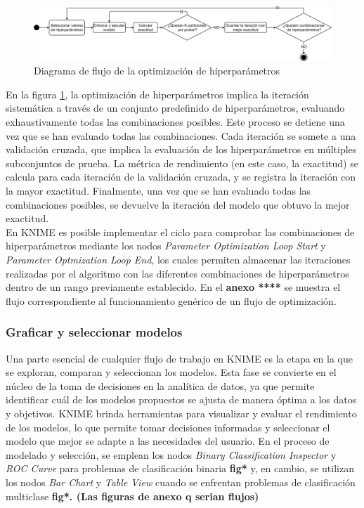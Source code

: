 \begin{figure}[H]
	\centering
	\includegraphics[width=1\linewidth]{"figuras/capi 2/hpo/Optimizacion a resumen 2.14"}
	\caption{Diagrama de flujo de la optimización de hiperparámetros}
	\label{fig:optimizacion-a-resumen-2}
\end{figure}

En la figura \ref{fig:optimizacion-a-resumen-2}, la optimización de hiperparámetros implica la iteración sistemática a través de un conjunto predefinido de hiperparámetros, evaluando exhaustivamente todas las combinaciones posibles. Este proceso se detiene una vez que se han evaluado todas las combinaciones. Cada iteración se somete a una validación cruzada, que implica la evaluación de los hiperparámetros en múltiples subconjuntos de prueba. La métrica de rendimiento (en este caso, la exactitud) se calcula para cada iteración de la validación cruzada, y se registra la iteración con la mayor exactitud. Finalmente, una vez que se han evaluado todas las combinaciones posibles, se devuelve la iteración del modelo que obtuvo la mejor exactitud. \\
En KNIME es posible implementar el ciclo para comprobar las combinaciones de hiperparámetros mediante los nodos \textit{Parameter Optimization Loop Start} y \textit{Parameter Optmization Loop End}, los cuales permiten almacenar las iteraciones realizadas por el algoritmo con las diferentes combinaciones de hiperparámetros dentro de un rango previamente establecido. En el \textbf{anexo ****} se muestra el flujo correspondiente al funcionamiento genérico de un flujo de optimización.

\subsubsection*{Graficar y seleccionar modelos}
Una parte esencial de cualquier flujo de trabajo en KNIME es la etapa en la que se exploran, comparan y seleccionan los modelos. Esta fase se convierte en el núcleo de la toma de decisiones en la analítica de datos, ya que permite identificar cuál de los modelos propuestos se ajusta de manera óptima a los datos y objetivos.
KNIME brinda herramientas para visualizar y evaluar el rendimiento de los modelos, lo que permite tomar decisiones informadas y seleccionar el modelo que mejor se adapte a las necesidades del usuario. En el proceso de modelado y selección, se emplean los nodos \textit{Binary Classification Inspector} y \textit{ROC Curve} para problemas de clasificación binaria \textbf{fig*} y, en cambio, se utilizan los nodos \textit{Bar Chart} y \textit{Table View} cuando se enfrentan problemas de clasificación multiclase \textbf{fig*. (Las figuras de anexo q serian flujos)}


